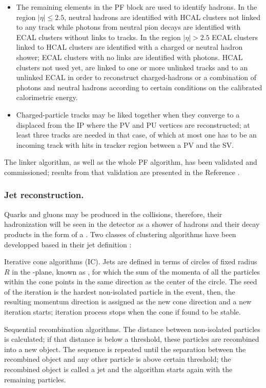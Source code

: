 \begin{itemize}
\item The remaining elements in the PF block are used to identify hadrons. In the region $|\eta| \leq 2.5$, neutral hadrons are identified with HCAL clusters not linked to any track while photons from neutral pion decays are identified with ECAL clusters without links to tracks. In the region $|\eta| >2.5$ ECAL clusters linked to HCAL clusters are identified with a charged or neutral hadron shower; ECAL clusters with no links are identified with photons.
  HCAL clusters not used yet, are linked to one or more unlinked tracks and to an unlinked ECAL in order to reconstruct charged-hadrons or a combination of photons and neutral hadrons according to certain conditions on the calibrated calorimetric energy.         

\item Charged-particle tracks may be liked together when they converge to a  displaced from the IP where the PV and PU vertices are reconstructed; at least three tracks are needed in that case, of which at most one has to be an incoming track with hits in tracker region between a PV and the SV.
\end{itemize}

The linker algorithm, as well as the whole PF algorithm, has been validated and commissioned; results from that validation are presented in the Reference \cite{particle_flow}.

\subsubsection*{Jet reconstruction.}

Quarks and gluons may be produced in the \pp collisions, therefore, their hadronization will be seen in the detector as a shower of hadrons and their decay products in the form of a . Two classes of clustering algorithms have been developped based in their jet definition \cite{coco}:  

\bit
\item Iterative cone algorithms (IC). Jets are defined in terms of circles of fixed radius $R$ in the \etac-\phic plane, known as , for which the sum of the momenta of all the particles within the cone points in the same direction as the center of the circle. The seed of the iteration is the hardest non-isolated particle in the event, then, the resulting momentum direction is assigned as the new cone direction and a new iteration starts; iteration process stops when the cone if found to be stable. 
\item Sequential recombination algorithms. The distance between non-isolated particles is calculated; if that distance is below a threshold, these particles are recombined into a new object. The sequence is repeated until the separation between the recombined object and any other particle is above certain threshold; the recombined object is called a jet and the algorithm starts again with the remaining particles.      
\eit


